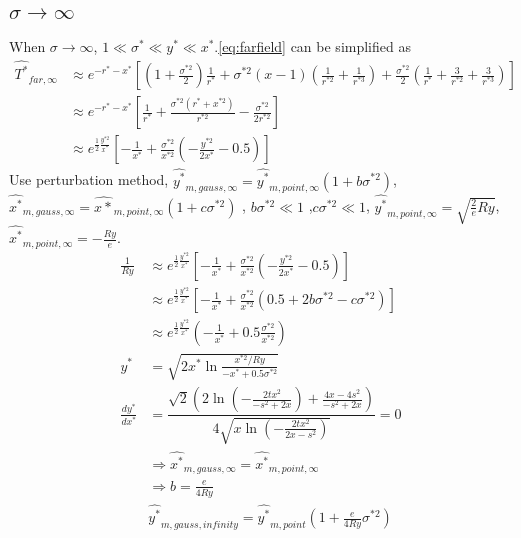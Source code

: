 \documentclass[review, 1p, number, sort&compress,table]{elsarticle}
\begin{document}
	\subsection{$\sigma\rightarrow{\infty}$}
	When $\sigma\rightarrow{\infty}$, $1 \ll \sigma^{*}\ll y^{*} \ll x^{*}$.\autoref{eq:farfield} can be simplified as
	\begin{align}  \label{eq:farfield.inf.1}
	\nonumber
	\widehat{T^*}_{far,\infty}
	&\approx e^{-r^{*}-x^{*}}\left[ \left(1+\frac{\sigma^{*2}}{2} \right)  \frac{1}{r^{*}} +\sigma^{*2}\left(x-1\right) \left(\frac{1}{r^{*2}}+\frac{1}{r^{*3}}\right)
	+\frac{\sigma^{*2}}{2}\left(\frac{1}{r^{*}}+\frac{3}{r^{*2}} +\frac{3}{r^{*3}}\right)\right]
	\\ \nonumber
	&\approx e^{-r^{*}-x^{*}}  \left[\frac{1}{r^{*}}+\frac{\sigma^{*2}\left(r^{*}+x^{*2}\right)}{r^{*2}}-\frac{\sigma^{*2}}{2r^{*2}}\right]
	\\ 
	&\approx e^{\frac{1}{2}\frac{y^{*2}}{x^{*}}}  \left[-\frac{1}{x^{*}}+\frac{\sigma^{*2}}{x^{*2}}\left(-\frac{y^{*2}}{2x^{*}}-0.5\right)\right]
	\end{align} 
	Use perturbation method, $\widehat{y^*}_{m,gauss,\infty}=\widehat{y^*}_{m,point,\infty}\left(1+b\sigma^{*2}\right)$,$\widehat{x^*}_{m,gauss,\infty}=\widehat{x*}_{m,point,\infty}\left(1+c\sigma^{*2}\right)$ , $b\sigma^{*2}\ll1$ ,$c\sigma^{*2}\ll1$, 
	$\widehat{y^*}_{m,point,\infty}=\sqrt{\frac{2}{e}Ry}$, $\widehat{x^*}_{m,point,\infty}=-\frac{Ry}{e}$.
	\begin{align}  
		\nonumber
		\frac{1}{Ry} &\approx e^{\frac{1}{2}\frac{y^{*2}}{x^{*}}}  \left[-\frac{1}{x^{*}}+\frac{\sigma^{*2}}{x^{*2}}\left(-\frac{y^{*2}}{2x^{*}}-0.5\right)\right]
		\\ \nonumber 
		&\approx e^{\frac{1}{2}\frac{y^{*2}}{x^{*}}}  \left[-\frac{1}{x^{*}}+\frac{\sigma^{*2}}{x^{*2}}\left(0.5+2b\sigma^{*2}-c\sigma^{*2}\right)\right]
		\\ \nonumber
		&\approx e^{\frac{1}{2}\frac{y^{*2}}{x^{*}}}  \left(-\frac{1}{x^{*}}+0.5\frac{\sigma^{*2}}{x^{*2}}\right)
		\\ \nonumber
		y^*&=\sqrt{2x^*\ln{\frac{x^{*2}/Ry}{-x^{*}+0.5\sigma^{*2}}}}
		\\ \nonumber
		\frac{dy^*}{dx^*}&= \dfrac{\sqrt{2}\left(2\ln\left(-\frac{2tx^2}{-s^2+2x}\right)+\frac{4x-4s^2}{-s^2+2x}\right)}{4\sqrt{x\ln\left(-\frac{2tx^2}{2x-s^2}\right)}}=0
		\\ \nonumber
		&\Rightarrow \widehat{x^*}_{m,gauss,\infty}=\widehat{x^*}_{m,point,\infty}
		\\ \nonumber
		&\Rightarrow b=\frac{e}{4Ry} 
		\\
		& \widehat{y^*}_{m,gauss,infinity}=\widehat{y^*}_{m,point}\left(1+\frac{e}{4Ry}\sigma^{*2}\right)
		 \label{eq:farfield.inf}
    \end{align} 
\end{document}
